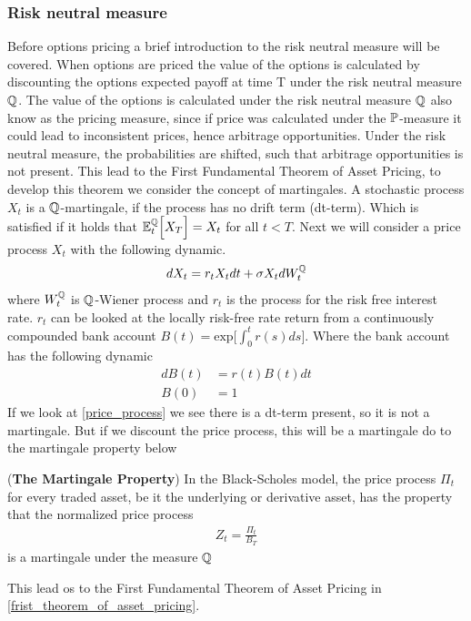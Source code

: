 \subsubsection{Risk neutral measure}
Before options pricing a brief introduction to the risk neutral measure will be covered.
When options are priced the value of the options is calculated by discounting 
the options expected payoff at time T under the risk neutral measure $\mathbb{Q}$. 
The value of the options is calculated under the risk neutral measure $\mathbb{Q}$ also know as the pricing measure, 
since if price was calculated under the $\mathbb{P}$-measure it could lead to inconsistent prices, hence arbitrage opportunities. 
Under the risk neutral measure, the probabilities are shifted, such that arbitrage opportunities is not present. This lead to 
the First Fundamental Theorem of Asset Pricing, to develop this theorem we consider the concept of martingales. 
A stochastic process $X_t$ is a $\mathbb{Q}$-martingale, if the process has no drift term (dt-term). Which is satisfied if it holds that
$\mathbb{E}_{t}^{\mathbb{Q}}\Big[X_T\Big] = X_t$ for all $t<T$. Next we will consider a price process $X_t$ with the following dynamic.
\begin{align}
    d X_t = r_t X_t dt + \sigma X_t d W_{t}^{\mathbb{Q}}
    \label{price_process}
\end{align}
where $W_{t}^{\mathbb{Q}}$ is $\mathbb{Q}$-Wiener process and  $r_t$ is the process for the risk free interest rate. $r_t$ can be looked at the locally risk-free rate return 
from a continuously compounded bank account $B(t)= \text{exp} \Big[\int_{0}^{t}r(s)ds \Big]$.
Where the bank account has the following dynamic
\begin{align*}
    dB(t) &= r(t)B(t) dt \\
    B(0) & = 1
\end{align*}
If we look at \autoref{price_process} we see there is a dt-term present, so it is not a martingale.
But if we discount the price process, this will be a martingale do to the martingale property below
\begin{proposition}
    (\textbf{The Martingale Property}) In the Black-Scholes model, the price process $\Pi_t$
    for every traded asset, be it the underlying or derivative asset, has the property that the normalized price process
    \begin{align*}
        Z_t = \frac{\Pi_t}{B_T}
    \end{align*}
    is a martingale under the measure $\mathbb{Q}$ \cite{Bjork}
\end{proposition}
\noindent 
This lead os to the First Fundamental Theorem of Asset Pricing in \autoref{frist_theorem_of_asset_pricing}.
